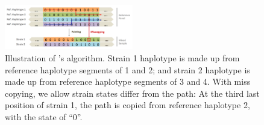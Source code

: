 \documentclass{bioinfo}
\begin{document}
\begin{methods}
\begin{figure}[ht]
\centering
\includegraphics[width=0.5\textwidth]{coupled-painting.png}
\caption{Illustration of \citet{Li2003}'s algorithm. Strain 1 haplotype is made up from reference haplotype segments of 1 and 2; and strain 2 haplotype is made up from reference haplotype segments of 3 and 4. With miss copying, we allow strain states differ from the path: At the third last position of strain 1, the path is copied from reference haplotype 2, with the state of ``0''.
}\label{fig:ls}
\end{figure}


\end{methods}
\end{document}
